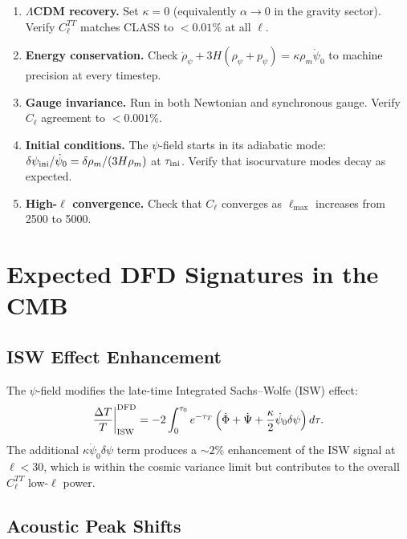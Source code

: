 \documentclass[11pt,a4paper]{article}
\theoremstyle{remark}
\begin{document}
\begin{enumerate}
\item \textbf{$\Lambda$CDM recovery.} Set $\kappa = 0$ (equivalently $\alpha \to 0$
  in the gravity sector). Verify $C_\ell^{TT}$ matches CLASS to $< 0.01\%$
  at all $\ell$.

\item \textbf{Energy conservation.} Check
  $\dot\rho_\psi + 3H(\rho_\psi + p_\psi) = \kappa\rho_m\dot\psi_0$
  to machine precision at every timestep.

\item \textbf{Gauge invariance.} Run in both Newtonian and synchronous gauge.
  Verify $C_\ell$ agreement to $< 0.001\%$.

\item \textbf{Initial conditions.} The $\psi$-field starts in its adiabatic mode:
  $\delta\psi_{\rm ini}/\dot\psi_0 = \delta\rho_m/(3H\rho_m)$ at $\tau_{\rm ini}$.
  Verify that isocurvature modes decay as expected.

\item \textbf{High-$\ell$ convergence.} Check that $C_\ell$ converges as
  $\ell_{\max}$ increases from 2500 to 5000.
\end{enumerate}

\section{Expected DFD Signatures in the CMB}

\subsection{ISW Effect Enhancement}

The $\psi$-field modifies the late-time Integrated Sachs--Wolfe (ISW) effect:
\begin{equation}
\frac{\Delta T}{T}\bigg|_{\rm ISW}^{\rm DFD} = -2\int_0^{\tau_0} e^{-\tau_T}
\left(\dot\Phi + \dot\Psi + \frac{\kappa}{2}\dot\psi_0\delta\psi\right) d\tau.
\end{equation}
The additional $\kappa\dot\psi_0\delta\psi$ term produces a $\sim 2\%$ enhancement
of the ISW signal at $\ell < 30$, which is within the cosmic variance limit
but contributes to the overall $C_\ell^{TT}$ low-$\ell$ power.

\subsection{Acoustic Peak Shifts}
\end{document}
